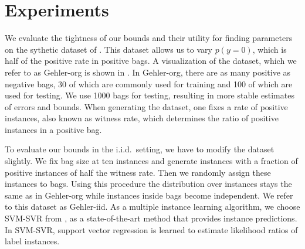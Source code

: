 \section{Experiments}
We evaluate the tightness of our bounds and their utility for finding parameters on the sythetic dataset of \citet{gehler2007deterministic}.
This dataset allows us to vary $p(y=0)$, which is half of the positive rate in positive bags.
A visualization of the dataset, which we refer to as Gehler-org is shown in . In Gehler-org, there are as many positive
as negative bags, 30 of which are commonly used for training and 100 of which are used for testing.
We use 1000 bags for testing, resulting in more stable estimates of errors and bounds.
When generating the dataset, one fixes a rate of positive instances, also known as witness rate, which determines the ratio
of positive instances in a positive bag.

To evaluate our bounds in the i.i.d.\ setting, we have to modify the dataset slightly. We fix bag size at ten instances and generate instances
with a fraction of positive instances of half the witness rate. Then we randomly assign these instances to bags.
Using this procedure the distribution over instances stays the same as in Gehler-org while instances inside bags become independent.
We refer to this dataset as Gehler-iid.
As a multiple instance learning algorithm, we choose SVM-SVR from \citet{liconvex2010}, as a state-of-the-art method that
provides instance predictions. In SVM-SVR, support vector regression is learned to estimate likelihood ratios of label instances.

